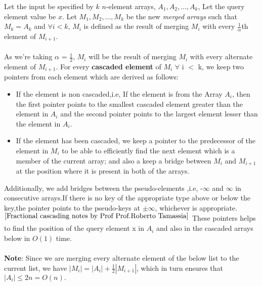 \documentclass[11pt]{article}
\begin{document}
Let the input be specified by $k$ $n$-element arrays, $A_1,A_2,\dots,A_k$, Let the query element value be $x$.
Let $M_1,M_2,\dots,M_k$ be the new \textit{merged arrays} such that $M_k = A_k$ and $\forall i < k$, $M_i$ is defined as the result of merging $M_i$ with every $\frac{1}{\alpha}$th element of $M_{i+1}$. \\ \\
As we're taking $\alpha$ = $\frac{1}{2}$, $M_i$ will be the result of merging $M_i$ with every alternate element of $M_{i+1}$. For every \textbf{cascaded element} of $M_i$ $\forall$ i $<$ k, we keep two pointers from each element which are derived as follows:
\begin{itemize}
    \item If the element is non cascaded,i.e, If the element is from the Array $A_i$, then the first pointer points to the smallest cascaded element greater than the element in $A_i$ and the second pointer points to the largest element lesser than the element in $A_i$. 
 
    \item If the element has been cascaded, we keep a pointer to the predecessor of the element in $M_i$ to be able to efficiently find the next element which is a member of the current array; and also a keep a bridge between $M_i$ and $M_{i+1}$ at the position where it is present in both of the arrays.
\end{itemize}
Additionally, we add bridges between the pseudo-elements ,i.e,  -$\infty$ and $\infty$ in consecutive arrays.If there is no key of the appropriate type above or below the key,the pointer points to the pseudo-keys at $\pm \infty$, whichever is appropriate.$^{\cite{Fractional cascading notes by Prof Prof.Roberto Tamassia}}$
These pointers helps to find the position of the query element x in $A_i$ and also in the cascaded arrays below in $O(1)$ time. \\ \\
\textbf{Note}: Since we are merging every alternate element of the below list to the current list, we have 
$|M_i| = |A_i| +\frac{1}{2}|M_{i+1}|$, which in turn ensures that $|A_i| \leq 2n = O(n).$ \\
\end{document}
